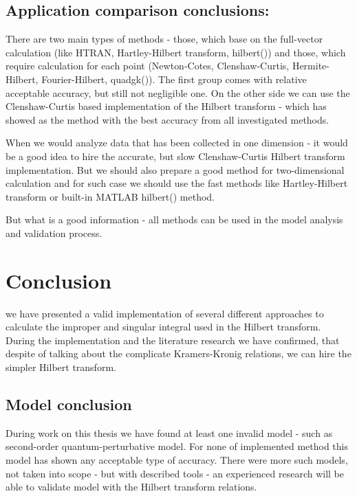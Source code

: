 \documentclass[12pt,twoside,a4paper]{article}
\numberwithin{equation}{subsection}
\numberwithin{figure}{subsection}
\begin{document}
\subsection{Application comparison conclusions:} \label{chap:gencom_application}


There are two main types of methods - those, which base on the full-vector calculation (like HTRAN, Hartley-Hilbert
transform, hilbert()) and those, which require calculation for each point (Newton-Cotes, Clenshaw-Curtis, Hermite-Hilbert,
Fourier-Hilbert, quadgk()). The first group comes with relative acceptable accuracy, but still not negligible one. On the other
side we can use the Clenshaw-Curtis based implementation of the Hilbert transform - which has showed as the method with the
best accuracy from all investigated methods.

When we would analyze data that has been collected in one dimension - it would be a good idea to hire the accurate, but slow
Clenshaw-Curtis Hilbert transform implementation. But we should also prepare a good method for two-dimensional calculation and for
such case we should use the fast methods like Hartley-Hilbert transform or built-in MATLAB \textregistered hilbert() method.

But what is a good information - all methods can be used in the model analysis and validation process.

\section{Conclusion} \label{chap:conclusion}

we have presented a valid implementation of several different approaches to calculate the improper and singular integral used in
the Hilbert transform. During the implementation and the literature research we have confirmed, that despite of talking about the
complicate Kramers-Kronig relations, we can hire the simpler Hilbert transform.

\subsection{Model conclusion} \label{chap:conclusion_model}


During work on this thesis we have found at least one invalid model - such as second-order quantum-perturbative model. For none of
implemented method this model has shown any acceptable type of accuracy. There were more such models, not taken into scope - but
with described tools - an experienced research will be able to validate model with the Hilbert transform relations.
\end{document}
